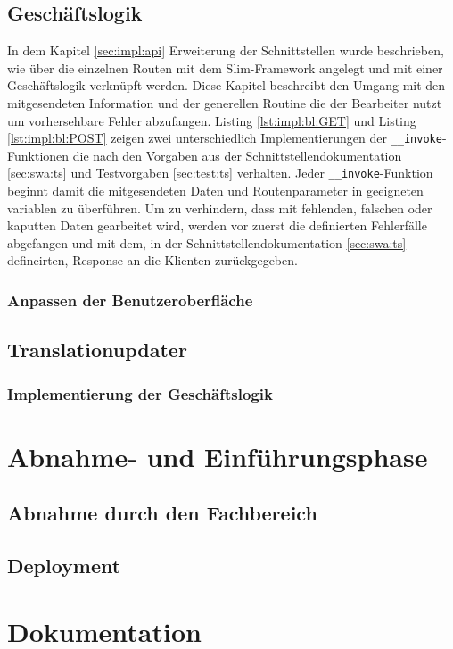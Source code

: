\documentclass[10pt, oneside]{article}
\begin{document}
  \subsection{Geschäftslogik}\label{sec:impl:bl}
    In dem Kapitel \ref{sec:impl:api} Erweiterung der Schnittstellen wurde beschrieben, wie über die einzelnen Routen mit dem Slim-Framework angelegt und 
    mit einer Geschäftslogik verknüpft werden. Diese Kapitel beschreibt den Umgang mit den mitgesendeten Information und der generellen Routine die der Bearbeiter
    nutzt um vorhersehbare Fehler abzufangen. Listing \ref{lst:impl:bl:GET} und Listing \ref{lst:impl:bl:POST} zeigen zwei unterschiedlich Implementierungen 
    der \lstinline{__invoke}-Funktionen die nach den Vorgaben aus der Schnittstellendokumentation \ref{sec:swa:ts} und Testvorgaben \ref{sec:test:ts} verhalten.
    Jeder \lstinline{__invoke}-Funktion beginnt damit die mitgesendeten Daten und Routenparameter in geeigneten variablen zu überführen. Um zu verhindern, dass mit 
    fehlenden, falschen oder kaputten Daten gearbeitet wird, werden vor zuerst die definierten Fehlerfälle abgefangen und mit dem, in der Schnittstellendokumentation \ref{sec:swa:ts} defineirten, Response
    an die Klienten zurückgegeben. 
  \subsubsection{Anpassen der Benutzeroberfläche}
  \subsection{Translationupdater}
  \subsubsection{Implementierung der Geschäftslogik}
  \section{Abnahme- und Einführungsphase}
  \subsection{Abnahme durch den Fachbereich}
  \subsection{Deployment}
  \section{Dokumentation}
\end{document}
